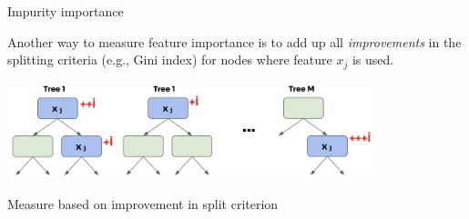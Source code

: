 \documentclass[11pt,compress,t,notes=noshow, xcolor=table]{beamer}
\begin{document}
\begin{vbframe}{Impurity importance}

{\small Another way to measure feature importance is to add up all \textit{improvements} in the splitting criteria (e.g., Gini index) for nodes where feature $x_j$ is used.}

\vspace{-1ex}
\begin{center}
\includegraphics[width=0.8\textwidth]{figure_man/forest-fimp_impurity.png}
\end{center}

\vspace{-3ex}
\begin{algorithm}[H]
\small
\caption*{Measure based on improvement in split criterion}
\begin{algorithmic}[1]
  \EndFor
  \EndFor
\end{algorithmic}
\end{algorithm}

\end{vbframe}
\end{document}
